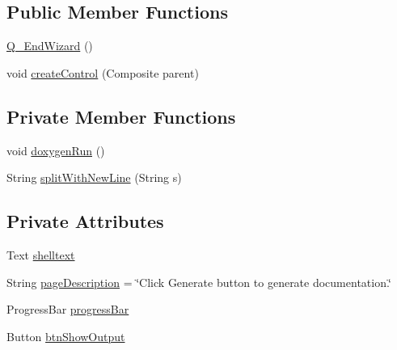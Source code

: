 \subsection*{Public Member Functions}
\begin{DoxyCompactItemize}
\item 
\hyperlink{classit_1_1isislab_1_1masonhelperdocumentation_1_1mason_1_1wizards_1_1_q___end_wizard_af9884b961a03b01b6309f83fdf8489c6}{Q\-\_\-\-End\-Wizard} ()
\item 
void \hyperlink{classit_1_1isislab_1_1masonhelperdocumentation_1_1mason_1_1wizards_1_1_q___end_wizard_a5370c5c6b82b0ae5dc3fede5a15bb871}{create\-Control} (Composite parent)
\end{DoxyCompactItemize}
\subsection*{Private Member Functions}
\begin{DoxyCompactItemize}
\item 
void \hyperlink{classit_1_1isislab_1_1masonhelperdocumentation_1_1mason_1_1wizards_1_1_q___end_wizard_a5711bf4858bd7e5787743ec96669a19d}{doxygen\-Run} ()
\item 
String \hyperlink{classit_1_1isislab_1_1masonhelperdocumentation_1_1mason_1_1wizards_1_1_q___end_wizard_a1cdec1efdad895973386d4679b790a1c}{split\-With\-New\-Line} (String s)
\end{DoxyCompactItemize}
\subsection*{Private Attributes}
\begin{DoxyCompactItemize}
\item 
Text \hyperlink{classit_1_1isislab_1_1masonhelperdocumentation_1_1mason_1_1wizards_1_1_q___end_wizard_ab4650e9141ffb45563506bcf2b5daa4e}{shelltext}
\item 
String \hyperlink{classit_1_1isislab_1_1masonhelperdocumentation_1_1mason_1_1wizards_1_1_q___end_wizard_ad26a3bb26c50c2d98f9e6931ac3d9e93}{page\-Description} = \char`\"{}Click Generate button to generate documentation.\char`\"{}
\item 
Progress\-Bar \hyperlink{classit_1_1isislab_1_1masonhelperdocumentation_1_1mason_1_1wizards_1_1_q___end_wizard_a43d65086e656c40478f720a0a9cac522}{progress\-Bar}
\item 
Button \hyperlink{classit_1_1isislab_1_1masonhelperdocumentation_1_1mason_1_1wizards_1_1_q___end_wizard_adabc78dc53c9ffd3c77d6e453db02cb6}{btn\-Show\-Output}
\end{DoxyCompactItemize}

